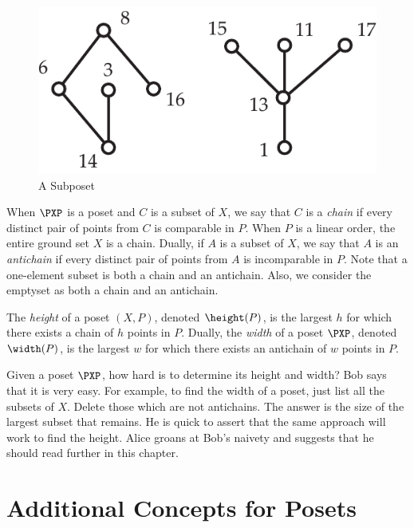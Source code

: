 \begin{figure}
\begin{center}
\includegraphics*[scale=.4]{posets-figs/subposet.pdf}
\caption{A Subposet}
\label{fig:subposet}
\end{center}
\end{figure}

When $\PXP$ is a poset and $C$ is a subset of $X$,
we say that $C$ is a \textit{chain} if every distinct pair of points 
from $C$ is comparable in $P$.  When $P$ is a linear order, the entire ground 
set $X$ is a chain.  Dually, if $A$ is a subset of $X$, we say that
$A$ is an \textit{antichain} if every distinct pair of points from $A$ 
is incomparable in $P$.  Note that a one-element subset
is both a chain and an antichain.  Also, we consider the emptyset as
both a chain and an antichain.

The \textit{height} of a poset
$(X,P)$, denoted $\height(P)$, is the largest $h$ for which there exists
a chain of $h$ points in $P$.
Dually, the \textit{width} of a poset $\PXP$, denoted $\width(P)$, is the
largest $w$ for which there exists an antichain of $w$ points in
$P$. 

\begin{remark}
Given a poset $\PXP$, how hard is to determine its height and width?
Bob says that it is very easy.  For example, to find the width of a poset, just 
list all the subsets of $X$.  Delete those which are not antichains.
The answer is the size of the largest subset that remains.  He is quick
to assert that the same approach will work to find the height.
Alice groans at Bob's naivety and suggests that he should read
further in this chapter.
\end{remark}

\section{Additional Concepts for Posets}

